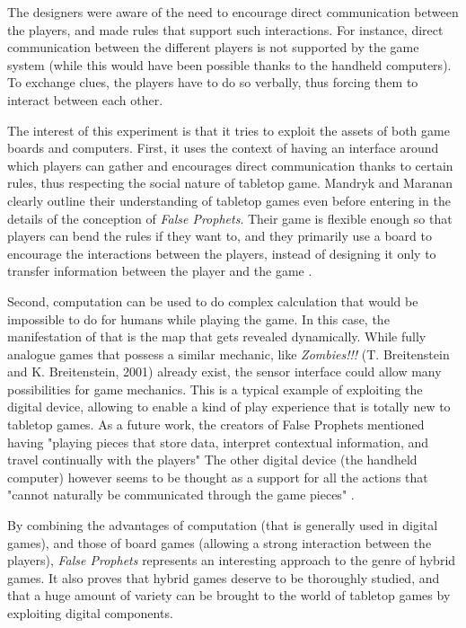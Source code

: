 The designers were aware of the need to encourage direct communication between the players, and made rules that support such interactions. For instance, direct communication between the different players is not supported by the game system (while this would have been possible thanks to the handheld computers). To exchange clues, the players have to do so verbally, thus forcing them to interact between each other. 

The interest of this experiment is that it tries to exploit the assets of both game boards and computers. First, it uses the context of having an interface around which players can gather and encourages direct communication thanks to certain rules, thus respecting the social nature of tabletop game. Mandryk and Maranan clearly outline their understanding of tabletop games even before entering in the details of the conception of \textit{False Prophets}. Their game is flexible enough so that players can bend the rules if they want to, and they primarily use a board to encourage the interactions between the players, instead of designing it only to transfer information between the player and the game \cite{art:prophets}.

Second, computation can be used to do complex calculation that would be impossible to do for humans while playing the game. In this case, the manifestation of that is the map that gets revealed dynamically.  While fully analogue games  that possess a similar mechanic, like \textit{Zombies!!!} (T. Breitenstein and K. Breitenstein, 2001)\cite{game:zombies} already exist, the sensor interface could allow many possibilities for game mechanics. This is a typical example of exploiting the digital device, allowing to enable a kind of play experience that is totally new to tabletop games. As a future work, the creators of False Prophets mentioned having "playing pieces that store data, interpret contextual information, and travel continually with the players" The other digital device (the handheld computer) however seems to be thought as a support for all the actions that "cannot naturally be communicated through the game pieces" \cite{art:prophets}.

By combining the advantages of computation (that is generally used in digital games), and those of board games (allowing a strong interaction between the players), \textit{False Prophets} represents an interesting approach to the genre of hybrid games. It also proves that hybrid games deserve to be thoroughly studied, and that a huge amount of variety can be brought to the world of tabletop games by exploiting digital components.

